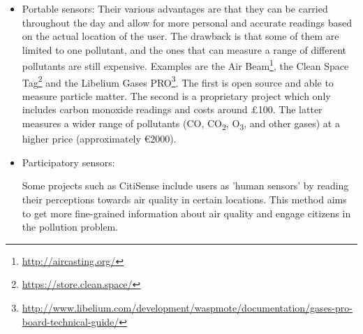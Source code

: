 \begin{itemize}
\item Portable sensors: Their various advantages are that they can be carried throughout the day and allow for more personal and accurate readings based on the actual location of the user. The drawback is that some of them are limited to one pollutant, and the ones that can measure a range of different pollutants are still expensive. Examples are the Air Beam\footnote{\url{http://aircasting.org/}}, the Clean Space Tag\footnote{\url{https://store.clean.space/}} and the Libelium Gases PRO\footnote{\url{http://www.libelium.com/development/waspmote/documentation/gases-pro-board-technical-guide/}}. The first is open source and able to measure particle matter. The second is a proprietary project which only includes carbon monoxide readings and costs around \pounds100. The latter measures a wider range of pollutants (CO, CO\textsubscript{2}, O\textsubscript{3}, \NOX and other gases) at a higher price (approximately \euro{}2000). 

\item Participatory sensors:

Some projects such as CitiSense \cite{Nikzad2012} include users as 'human sensors' by reading their perceptions towards air quality in certain locations. This method aims to get more fine-grained information about air quality and engage citizens in the pollution problem. 

\end{itemize}



